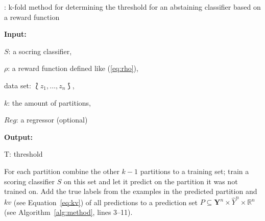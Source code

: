 \documentclass[twoside,11pt]{article}
\def\ds{\Lbag z_1,\dots,z_n \Rbag}
\def\Y{\textbf{Y}}
\begin{document}
\begin{algorithm}
  \caption{: k-fold method for determining the threshold
             for an abstaining classifier based on a
             reward function}
  \label{alg:method}

  \textbf{Input:}

  \quad $S$: a socring classifier,

  \quad $\rho$: a reward function defined like
        (\ref{eq:rho}),

  \quad data set: $\ds$,

  \quad $k$: the amount of partitions,

  \quad $Reg$: a regressor (optional)

  \textbf{Output:}

  \quad T: threshold

  \begin{algorithmic}[1]
      \ENDFOR
    \ENDFOR
    \ENDIF
  \end{algorithmic}
\end{algorithm}

For each partition combine the other $k-1$ partitions to a
training set; train a scoring classifier $S$ on this
set and let it predict on the partition it was not trained
on.
Add the true labels from the examples in the predicted
partition and $kv$ (see Equation~\ref{eq:kv}) of all
predictions to a prediction set
$P \subseteq \Y^n \times \hat{Y}^n \times \mathbb{R}^n$
(see Algorithm~\ref{alg:method}, lines 3--11).
\end{document}
